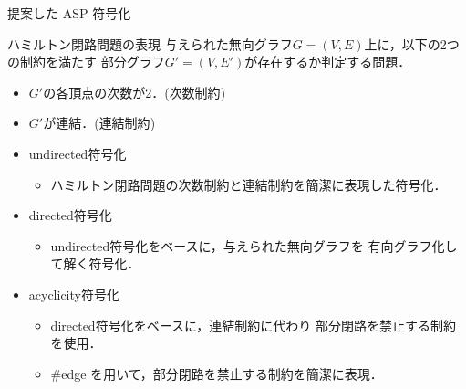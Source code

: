 \documentclass[dvipdfmx,10pt]{beamer}
\begin{document}
\begin{frame}{提案した ASP 符号化}
  \begin{block}{ハミルトン閉路問題の表現}
    与えられた無向グラフ$G= (V,E)$上に，以下の2つの制約を満たす
    部分グラフ$G'= (V,E')$が存在するか判定する問題．
    \begin{itemize}
    \item $G'$の各頂点の次数が2．(\alert{次数制約})
    \item $G'$が連結．(\alert{連結制約})
    \end{itemize}
  \end{block}
  \begin{itemize}
  \item \alert{\textsf{undirected}符号化}
    \begin{itemize}
    \item ハミルトン閉路問題の次数制約と連結制約を簡潔に表現した符号化．
    \end{itemize}
  \item \alert{\textsf{directed}符号化}
    \begin{itemize}
    \item \textsf{undirected}符号化をベースに，与えられた無向グラフを
      有向グラフ化して解く符号化．
    \end{itemize}
  \item \alert{\textsf{acyclicity}符号化}
    \begin{itemize}
    \item \textsf{directed}符号化をベースに，連結制約に代わり
      部分閉路を禁止する制約を使用．
      \item \#edge を用いて，部分閉路を禁止する制約を簡潔に表現．
    \end{itemize}
  \end{itemize}
\end{frame}
\end{document}
